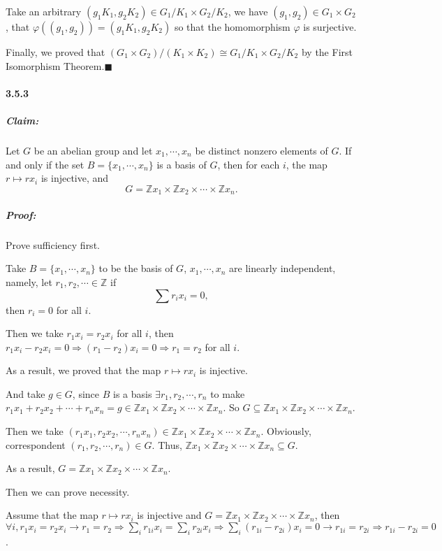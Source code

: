 \documentclass[11pt]{article}
\begin{document}
		Take an arbitrary $(g_1K_1, g_2K_2) \in G_1 / K_1 \times G_2 / K_2$, we have $(g_1, g_2) \in G_1 \times G_2$, that $\varphi((g_1, g_2)) = (g_1K_1, g_2K_2)$ so that the homomorphism $\varphi$ is surjective.
		
		Finally, we proved that $(G_1 \times G_2) / (K_1 \times K_2) \cong G_1 / K_1 \times G_2 / K_2$ by the First Isomorphism Theorem.$\blacksquare$
	\paragraph{3.5.3}
		\subparagraph{Claim:} Let $G$ be an abelian group and let $x_1, \cdots, x_n$ be distinct nonzero elements of $G$. If and only if the set $B = \{x_1, \cdots, x_n\}$ is a basis of $G$, then for each $i$, the map $r \mapsto rx_i$ is injective, and \[G = \mathbb{Z}x_1 \times \mathbb{Z}x_2 \times \cdots\times \mathbb{Z}x_n.\]
		\subparagraph{Proof:}
			Prove sufficiency first.
			
			Take $B = \{x_1, \cdots, x_n\}$ to be the basis of $G$, $x_1, \cdots, x_n$ are linearly independent, namely, let $r_1, r_2, \cdots \in \mathbb{Z}$ if \[\sum r_ix_i = 0,\] then $r_i = 0$ for all $i$.
			
			Then we take $r_1x_i = r_2x_i$ for all $i$, then $r_1x_i - r_2x_i = 0 \Rightarrow (r_1 - r_2)x_i = 0 \Rightarrow r_1 = r_2$ for all $i$.
			
			As a result, we proved that the map $r \mapsto rx_i$ is injective.
			
			And take $g \in G$, since $B$ is a basis $\exists r_1, r_2, \cdots, r_n$ to make $r_1x_1 + r_2x_2 + \cdots + r_nx_n = g \in \mathbb{Z}x_1 \times \mathbb{Z}x_2 \times \cdots\times \mathbb{Z}x_n$. So $G \subseteq \mathbb{Z}x_1 \times \mathbb{Z}x_2 \times \cdots\times \mathbb{Z}x_n$.
			
			Then we take $(r_1x_1, r_2x_2, \cdots, r_nx_n) \in \mathbb{Z}x_1 \times \mathbb{Z}x_2 \times \cdots\times \mathbb{Z}x_n$. Obviously, correspondent $(r_1, r_2, \cdots, r_n) \in G$. Thus, $\mathbb{Z}x_1 \times \mathbb{Z}x_2 \times \cdots\times \mathbb{Z}x_n \subseteq G$.
			
			As a result, $G = \mathbb{Z}x_1 \times \mathbb{Z}x_2 \times \cdots\times \mathbb{Z}x_n$.
			
			Then we can prove necessity.
			
			Assume that the map $r \mapsto rx_i$ is injective and $G = \mathbb{Z}x_1 \times \mathbb{Z}x_2 \times \cdots\times \mathbb{Z}x_n$, then $\forall i, r_1x_i = r_2x_i \rightarrow r_1 = r_2 \Rightarrow \sum_i r_{1i}x_i = \sum_i r_{2i}x_i \Rightarrow \sum_i (r_{1i} - r_{2i})x_i = 0 \rightarrow r_{1i} = r_{2i} \Rightarrow r_{1i} - r_{2i} = 0$.
			
\end{document}
